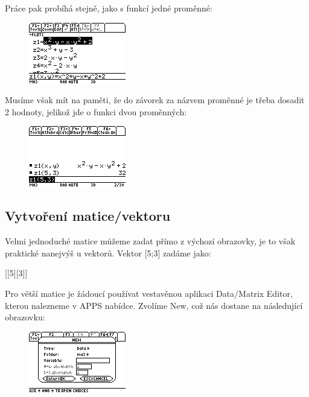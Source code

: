 \documentclass[10pt,a4paper,float]{article}
\begin{document}
Práce pak probíhá stejně, jako s funkcí jedné proměnné:

\begin{figure}[H]
	\centering
	\includegraphics[width=.5\textwidth]{img/2FUNC}
\end{figure}

Musíme však mít na paměti, že do závorek za názvem proměnné je třeba dosadit 2 hodnoty, jelikož jde o funkci dvou proměnných:

\begin{figure}[H]
	\centering
	\includegraphics[width=.5\textwidth]{img/2FUNC_UZITI}
\end{figure}

\pagebreak

\subsection{Vytvoření matice/vektoru}
\label{ssec:matice}
Velmi jednoduché matice můžeme zadat přímo z výchozí obrazovky, je to však praktické nanejvýš u vektorů. Vektor [5;3] zadáme jako:

[[5][3]]

Pro větší matice je žádoucí používat vestavěnou aplikaci Data/Matrix Editor, kterou nalezneme v APPS nabídce. Zvolíme New, což nás dostane na následující obrazovku:

\begin{figure}[H]
	\centering
	\includegraphics[width=.5\textwidth]{img/DATAEDITOR}
\end{figure}
\end{document}
